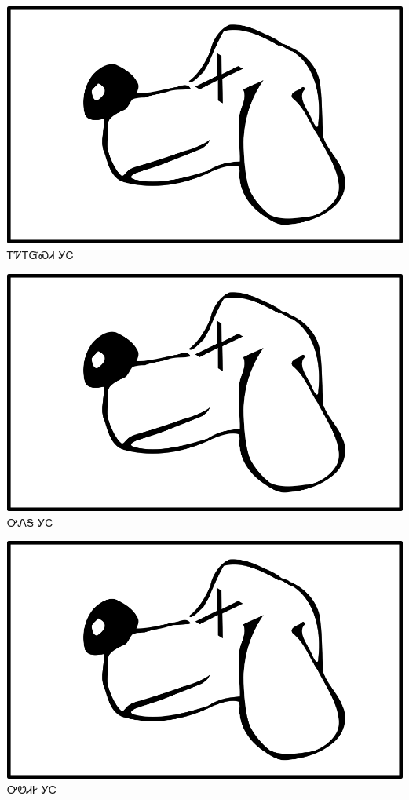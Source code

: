 \documentclass[avery5371]{flashcards}%
\begin{document}
    \begin{flashcard}{
        \includegraphics[width=0.95\columnwidth,height=.51\columnwidth,keepaspectratio]{../artwork/for-colors/gihli-dead}
    }
        \Huge ᎢᏤᎢᏳᏍᏗ ᎩᏟ
    \end{flashcard}

    \begin{flashcard}{
        \includegraphics[width=0.95\columnwidth,height=.51\columnwidth,keepaspectratio]{../artwork/for-colors/gihli-dead}
    }
        \Huge ᎤᏁᎦ ᎩᏟ
    \end{flashcard}

    \begin{flashcard}{
        \includegraphics[width=0.95\columnwidth,height=.51\columnwidth,keepaspectratio]{../artwork/for-colors/gihli-dead}
    }
        \Huge ᎤᏬᏗᎨ ᎩᏟ
    \end{flashcard}
\end{document}
